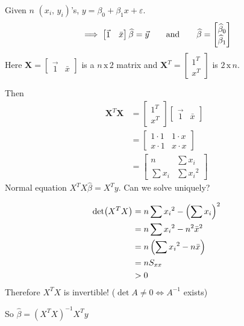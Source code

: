 
\nl Given $n$ $(x_i,\, y_i)$'s, $y = \beta_0 + \beta_1 x + \varepsilon$. 
$$\implies \begin{bmatrix}
    \vec 1 & \bar x
\end{bmatrix} \widehat{\beta} = \vec y \qquad \text{and} \qquad \widehat{\beta} = \begin{bmatrix}
    \widehat{\beta}_0\\ \widehat{\beta}_1
\end{bmatrix}$$
Here $\mathbf X = \begin{bmatrix}
    \vec 1 & \bar x
\end{bmatrix}$ is a $n\,\text{x}\,2$ matrix and $\mathbf X^T = \begin{bmatrix}
    1^T\\ x^T
\end{bmatrix}$ is $2\,\text{x}\,n$.

\nl Then
\begin{align*}
    \mathbf X^T \mathbf X &= \begin{bmatrix}
        1^T\\ x^T
    \end{bmatrix} \begin{bmatrix}
        \vec 1 & \bar x
    \end{bmatrix}\\
    &= \begin{bmatrix}
        1 \cdot 1 & 1 \cdot x\\ x \cdot 1 & x \cdot x \end{bmatrix}\\
        &= \begin{bmatrix}
            n & \sum x_i\\ \sum x_i & \sum {x_i}^2
        \end{bmatrix}
\end{align*}
Normal equation $X^TX \widehat{\beta} = X^T y$. Can we solve uniquely? 

\begin{align*}
    \det (X^TX) &= n \sum {x_i}^2 - \pars{\sum x_i}^2\\
    &= n \sum {x_i}^2 - n^2 \bar x^2\\
    &= n \pars{\sum {x_i}^2 - n \bar x}\\
    &= n S_{xx}\\
    &>0
\end{align*}
Therefore $X^TX$ is invertible! ($\det A \ne 0 \iff A^{-1}$ exists)

\nl So $\widehat{\beta} = (X^TX)^{-1}X^Ty$

